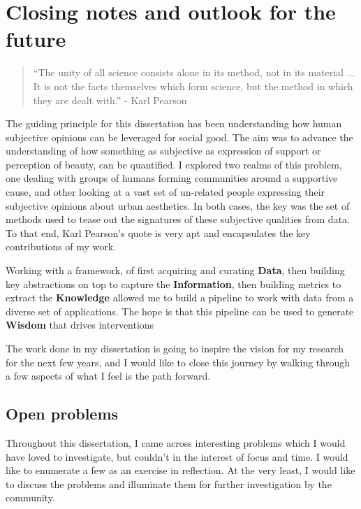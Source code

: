 \chapter{ Closing notes and outlook for the future }


\graphicspath{{Chapter6/plots/}}

\begin{quote}
    ``The unity of all science consists alone in its method, not in its material ... It is not the facts themselves which form science, but the method in which they are dealt with.'' - Karl Pearson
\end{quote}


The guiding principle for this dissertation has been understanding how human subjective opinions can be leveraged for social good. The aim was to advance the understanding of how something as subjective as expression of support or perception of beauty, can be quantified. 
I explored two realms of this problem, one dealing with groups of humans forming communities around a supportive cause, and other looking at a vast set of un-related people expressing their subjective opinions about urban aesthetics. In both cases, the key was the set of methods used to tease out the signatures of these subjective qualities from data. To that end, Karl Pearson's quote is very apt and encapsulates the key contributions of my work.

Working with a framework, of first acquiring and curating \textbf{Data}, then building key abstractions on top to capture the \textbf{Information}, then building metrics to extract the \textbf{Knowledge} allowed me to build a pipeline to work with data from a diverse set of applications. The hope is that this pipeline can be used to generate \textbf{Wisdom} that drives interventions

The work done in my dissertation is going to inspire the vision for my research for the next few years, and I would like to close this journey by walking through a few aspects of what I feel is the path forward.

\section{Open problems}
Throughout this dissertation, I came across interesting problems which I would have loved to investigate, but couldn't in the interest of focus and time. I would like to enumerate a few as an exercise in reflection. At the very least, I would like to discuss the problems and illuminate them for further investigation by the community. 

